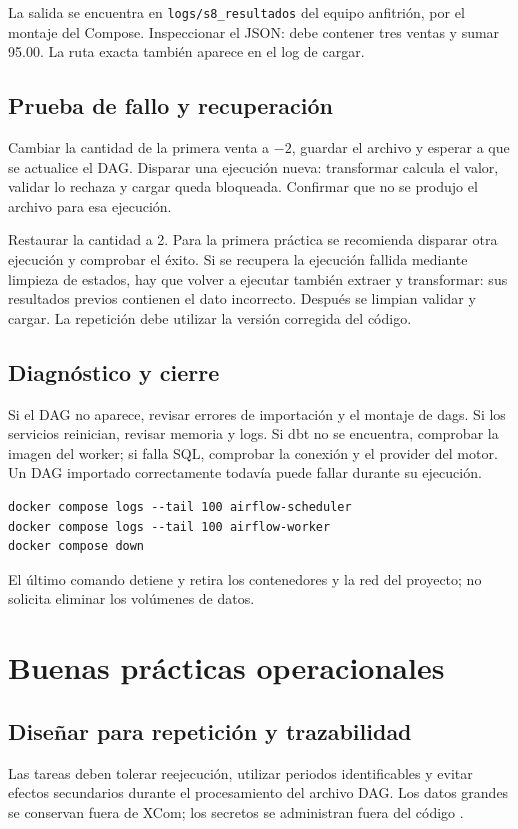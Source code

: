 \documentclass[12pt]{article}
\begin{document}
La salida se encuentra en \texttt{logs/s8\_resultados} del equipo anfitrión, por el montaje del Compose. Inspeccionar el JSON: debe contener tres ventas y sumar 95.00. La ruta exacta también aparece en el log de cargar.

\subsection{Prueba de fallo y recuperación}
Cambiar la cantidad de la primera venta a $-2$, guardar el archivo y esperar a que se actualice el DAG. Disparar una ejecución nueva: transformar calcula el valor, validar lo rechaza y cargar queda bloqueada. Confirmar que no se produjo el archivo para esa ejecución.

Restaurar la cantidad a 2. Para la primera práctica se recomienda disparar otra ejecución y comprobar el éxito. Si se recupera la ejecución fallida mediante limpieza de estados, hay que volver a ejecutar también extraer y transformar: sus resultados previos contienen el dato incorrecto. Después se limpian validar y cargar. La repetición debe utilizar la versión corregida del código.

\subsection{Diagnóstico y cierre}
Si el DAG no aparece, revisar errores de importación y el montaje de dags. Si los servicios reinician, revisar memoria y logs. Si dbt no se encuentra, comprobar la imagen del worker; si falla SQL, comprobar la conexión y el provider del motor. Un DAG importado correctamente todavía puede fallar durante su ejecución.
\begin{lstlisting}[style=terminal]
docker compose logs --tail 100 airflow-scheduler
docker compose logs --tail 100 airflow-worker
docker compose down
\end{lstlisting}
El último comando detiene y retira los contenedores y la red del proyecto; no solicita eliminar los volúmenes de datos.

\section{Buenas prácticas operacionales}
\subsection{Diseñar para repetición y trazabilidad}
Las tareas deben tolerar reejecución, utilizar periodos identificables y evitar efectos secundarios durante el procesamiento del archivo DAG. Los datos grandes se conservan fuera de XCom; los secretos se administran fuera del código \cite{airflow_best}.
\end{document}
